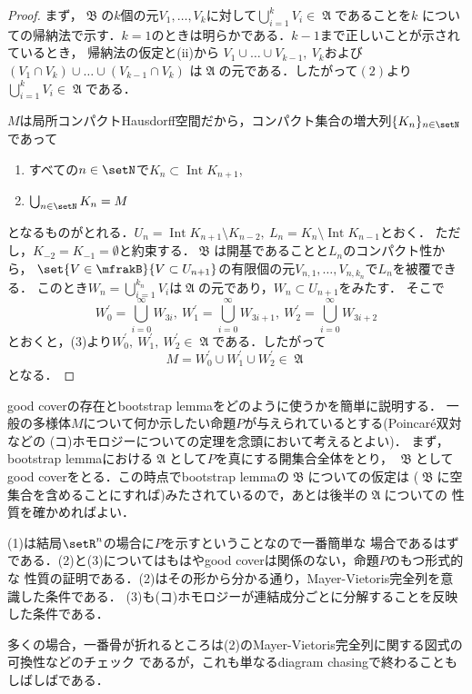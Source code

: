 \documentclass[uplatex]{jsarticle}
\DeclareMathOperator{\Int}{Int}
\begin{document}
\begin{proof}
  まず，$\mfrakB$の$k$個の元$V_1, \dots, V_k$に対して$\bigcup_{i=1}^k V_i\in \mfrakA$であることを$k$
  についての帰納法で示す．$k=1$のときは明らかである．$k-1$まで正しいことが示されているとき，
  帰納法の仮定と(ii)から
  $V_1\cup\dots\cup V_{k-1},\ V_k$および$(V_1\cap V_k)\cup\dots \cup (V_{k-1}\cap V_k)$
  は$\mfrakA$の元である．したがって$(2)$より$\bigcup_{i=1}^k V_i\in\mfrakA$である．

  $M$は局所コンパクトHausdorff空間だから，コンパクト集合の増大列$\{K_n\}_{n\in \setN}$
  であって
  \begin{enumerate}
    \item すべての$n\in\setN$で$K_n\subset \Int K_{n+1}$,
    \item $\bigcup_{n\in\setN} K_n = M$
  \end{enumerate}
  となるものがとれる．$U_{n}=\Int K_{n+1}\setminus K_{n-2},\ L_n=K_n\setminus \Int K_{n-1}$とおく．
  ただし，$K_{-2}=K_{-1}=\emptyset$と約束する．$\mfrakB$は開基であることと$L_n$のコンパクト性から，
  $\set{V\in\mfrakB}{V\subset U_{n+1}}$の有限個の元$V_{n,1},\dots, V_{n,k_n}$で$L_n$を被覆できる．
  このとき$W_n=\bigcup_{i=1}^{k_n} V_i$は$\mfrakA$の元であり，$W_n\subset U_{n+1}$をみたす．
  そこで
    \[W^\prime_0=\bigcup_{i=0}^\infty W_{3i},\  W^\prime_1=\bigcup_{i=0}^\infty W_{3i+1},\ 
      W^\prime_2=\bigcup_{i=0}^\infty W_{3i+2}\]
  とおくと，(3)より$W^\prime_0,\ W^\prime_1,\ W^\prime_2\in\mfrakA$である．したがって
    \[M=W^\prime_0\cup W^\prime_1\cup W^\prime_2\in\mfrakA\]
  となる．
\end{proof}

good coverの存在とbootstrap lemmaをどのように使うかを簡単に説明する．
一般の多様体$M$について何か示したい命題$P$が与えられているとする(Poincar\'{e}双対などの
(コ)ホモロジーについての定理を念頭において考えるとよい)．
まず，bootstrap lemmaにおける$\mfrakA$として$P$を真にする開集合全体をとり，
$\mfrakB$としてgood coverをとる．この時点でbootstrap lemmaの$\mfrakB$についての仮定は
($\mfrakB$に空集合を含めることにすれば)みたされているので，あとは後半の$\mfrakA$についての
性質を確かめればよい．

(1)は結局$\setR^n$の場合に$P$を示すということなので一番簡単な
場合であるはずである．(2)と(3)についてはもはやgood coverは関係のない，命題$P$のもつ形式的な
性質の証明である．(2)はその形から分かる通り，Mayer-Vietoris完全列を意識した条件である．
(3)も(コ)ホモロジーが連結成分ごとに分解することを反映した条件である．

多くの場合，一番骨が折れるところは(2)のMayer-Vietoris完全列に関する図式の可換性などのチェック
であるが，これも単なるdiagram chasingで終わることもしばしばである．
\end{document}
